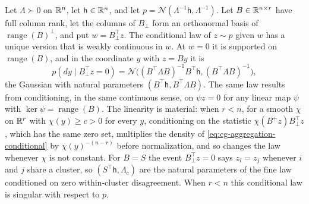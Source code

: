 Let \(\Lambda\succ0\) on \(\mathbb R^n\), let \(\mathsf h\in\mathbb R^n\), and let
\(p=\mathcal N(\Lambda^{-1}\mathsf h,\Lambda^{-1})\). Let
\(B\in\mathbb R^{n\times r}\) have full column rank, let the columns of \(B_\perp\)
form an orthonormal basis of \(\operatorname{range}(B)^\perp\), and put
\(w=B_\perp^\top z\). The conditional law of \(z\sim p\) given \(w\) has a
unique version that is weakly continuous in \(w\). At \(w=0\) it is supported
on \(\operatorname{range}(B)\), and in the coordinate \(y\) with \(z=By\) it is
\begin{equation}
p(dy\mid B_\perp^\top z=0)
=\mathcal N\bigl((B^\top\Lambda B)^{-1}B^\top\mathsf h,(B^\top\Lambda B)^{-1}\bigr),
\label{eq:cg-aggregation-conditional}
\end{equation}
the Gaussian with natural parameters \((B^\top\mathsf h,B^\top\Lambda B)\). The
same law results from conditioning, in the same continuous sense, on
\(\psi z=0\) for any linear map \(\psi\) with \(\ker\psi=\operatorname{range}(B)\).
The linearity is material: when \(r<n\), for a smooth \(\chi\) on \(\mathbb R^r\) with
\(\chi(y)\geq c>0\) for every \(y\), conditioning on
the statistic \(\chi(B^+z)B_\perp^\top z\), which has the same zero set,
multiplies the density of \eqref{eq:cg-aggregation-conditional} by
\(\chi(y)^{-(n-r)}\) before normalization, and so changes the law whenever
\(\chi\) is not constant. For \(B=S\) the event \(B_\perp^\top z=0\) says
\(z_i=z_j\) whenever \(i\) and \(j\) share a cluster, so
\((S^\top\mathsf h,\Lambda_{\mathrm c})\) are the natural parameters of the fine
law conditioned on zero within-cluster disagreement. When \(r<n\) this
conditional law is singular with respect to \(p\). 

